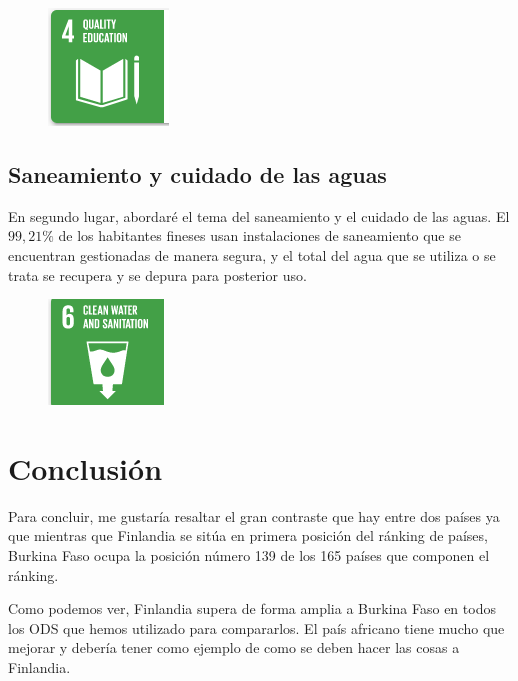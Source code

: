 \documentclass{article}[11pt]
\begin{document}
\begin{figure}[h]
    \centering
        \includegraphics[scale=0.9]{educacion-ods}
\end{figure}

\subsection{Saneamiento y cuidado de las aguas}


En segundo lugar, abordaré el tema del saneamiento y el cuidado de las aguas. El $99,21 \%$ de los habitantes fineses usan instalaciones de saneamiento que se encuentran gestionadas de manera segura, y el total del agua que se utiliza o se trata se recupera y se depura para posterior uso.


\begin{figure}[h]
    \centering
        \includegraphics[scale=0.9]{sanitation-ods}
\end{figure}

\newpage

\section{Conclusión}
Para concluir, me gustaría resaltar el gran contraste que hay entre dos países ya que mientras que Finlandia se sitúa en primera posición del ránking de países, Burkina Faso ocupa la posición número 139 de los 165 países que componen el ránking. 

Como podemos ver, Finlandia supera de forma amplia a Burkina Faso en todos los ODS que hemos utilizado para compararlos. El país africano tiene mucho que mejorar y debería tener como ejemplo de como se deben hacer las cosas a Finlandia.
\end{document}
